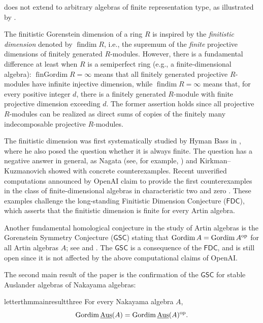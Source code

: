 \documentclass[a4paper]{amsart}
\theoremstyle{definition}
\theoremstyle{remark}
\numberwithin{equation}{theorem}
\newcommand{\findim}{\operatorname{findim}}
\newcommand{\sAus}{\operatorname{\underline{Aus}}}
\newcommand{\gordim}{\operatorname{Gordim}}
\newcommand{\fingordim}{\operatorname{finGordim}}
\newcommand{\op}{\textnormal{op}}
\begin{document}
 does not extend to arbitrary algebras of finite representation type, as illustrated by .



The finitistic Gorenstein dimension of a ring $ R $ is inspired by the \emph{finitistic dimension} denoted by $ \findim R $, i.e., the supremum of the \emph{finite} projective dimensions of finitely generated $ R $-modules.
However, there is a fundamental difference at least when $ R $ is a semiperfect ring (e.g., a finite-dimensional algebra): $ \fingordim R = \infty $ means that all finitely generated projective $ R $-modules have infinite injective dimension, while $ \findim R = \infty $ means that, for every positive integer $ d $, there is a finitely generated $ R $-module with finite projective dimension exceeding $ d $. The former assertion holds since all projective $ R $-modules can be realized as direct sums of copies of the finitely many indecomposable projective $ R $-modules.




The finitistic dimension was first systematically studied by Hyman Bass in \cite{Ba}, where he also posed the question whether it is always finite. The question has a negative answer in general, as Nagata (see, for example, \cite{K}) and Kirkman--Kuzmanovich \cite{KK} showed with concrete counterexamples. Recent unverified computations announced by OpenAI claim to provide the first counterexamples in the class of finite-dimensional algebras in characteristic two and zero \cite{OAI1,OAI2}. These examples challenge the long-standing Finitistic Dimension Conjecture ($\mathsf{FDC}$), which asserts that the finitistic dimension is finite for every Artin algebra.


Another fundamental homological conjecture in the study of Artin algebras is the Gorenstein Symmetry Conjecture ($\mathsf{GSC}$) stating that $ \gordim A = \gordim { A^\op }$ for all Artin algebras $A$; see \cite[page 150]{AR6} and \cite[Conjecture 13]{ARS}.
The $\mathsf{GSC}$ is a consequence of the $\mathsf{FDC}$, and is still open since it is not affected by the above computational claims of OpenAI.


The second main result of the paper is the confirmation of the $\mathsf{GSC}$ for stable Auslander algebras of Nakayama algebras:

\begin{restatable}{letterthm}{mainresultthree}
\label{mainresult3}
For every Nakayama algebra $A$,
\[
\gordim \sAus(A) = \gordim\sAus(A)^{\op}.
\]
\end{restatable}
\end{document}
